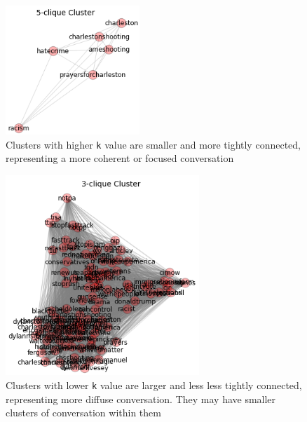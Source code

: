 \documentclass[12pt]{article}
\begin{document}
\begin{figure}[!ht]
  \centering
    \includegraphics[width=0.45\textwidth]{F3_5clique_clusters.png}
    \caption{Clusters with higher \texttt{k} value are smaller and  more tightly connected, representing a more coherent  or focused conversation}
  \label{fig:5clique}
\end{figure}

\begin{figure}[!ht]
  \centering
    \includegraphics[width=0.65\textwidth]{F4_3clique_clusters.png}
    \caption{Clusters  with  lower  \texttt{k}  value  are  larger  and  less  less  tightly  connected,  representing  more  diffuse  conversation.  They  may  have  smaller  clusters  of  conversation within them}
  \label{fig:3clique}
\end{figure}
\end{document}
